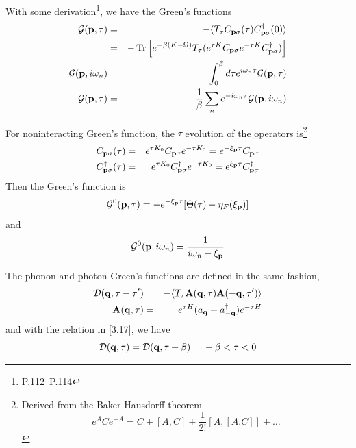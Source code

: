 With some derivation\footnote{P.112~P.114}, we have the Green's functions
\begin{eqnarray}
  \mathcal{G}(\mathbf{p},\tau)&=&-\langle T_\tau C_{\mathbf{p}\sigma}(\tau) C^\dagger_{\mathbf{p}\sigma}(0) \rangle \label{3.33}\\
    &=& -\Tr \left[ e^{-\beta (K-\Omega)} T_\tau (e^{\tau K} C_{\mathbf{p}\sigma} e^{-\tau K} C^\dagger_{\mathbf{p}\sigma})\right] \label{3.34} \\
  \mathcal{G}(\mathbf{p},i\omega_n) &=& \int_0^\beta d\tau e^{i\omega_n \tau} \mathcal{G}(\mathbf{p},\tau)  \label{3.39} \\
  \mathcal{G}(\mathbf{p},\tau) &=& \frac{1}{\beta} \sum_n e^{-i\omega_n \tau} \mathcal{G}(\mathbf{p},i\omega_n) \label{3.40}
\end{eqnarray}

For noninteracting Green's function, the $\tau$ evolution of the operators is\footnote{Derived from the Baker-Hausdorff theorem
\begin{equation*}
  e^ACe^{-A} = C+ [A,C] + \frac{1}{2!}[A,[A.C]]+\dots
\end{equation*}}
\begin{eqnarray}
  C_{\mathbf{p}\sigma}(\tau) &=& e^{\tau K_0} C_{\mathbf{p}\sigma} e^{-\tau K_0} = e^{-\xi_{\mathbf{p}} \tau} C_{\mathbf{p} \sigma } \label{3.44} \\
  C^\dagger_{\mathbf{p}\sigma}(\tau) &=& e^{\tau K_0} C^\dagger_{\mathbf{p}\sigma} e^{-\tau K_0} = e^{\xi_{\mathbf{p}} \tau} C_{\mathbf{p} \sigma }^\dagger \label{3.45}
\end{eqnarray}
Then the Green's function is
\begin{equation}
  \mathcal{G}^0(\mathbf{p},\tau)= -e^{-\xi_{\mathbf{p}} \tau}[\Theta(\tau)-\eta_F(\xi_{\mathbf{p}})] \label{3.49}
\end{equation}
and
\begin{equation}
  \mathcal{G}^0(\mathbf{p},i\omega_n) = \frac{1}{i\omega_n -\xi_{\mathbf{p}}}   \label{3.55}
\end{equation}

The phonon and photon Green's functions are defined in the same fashion,
\begin{eqnarray}
    \mathcal{D} (\mathbf{q},\tau-\tau') &=& - \langle T_\tau \mathbf{A}(\mathbf{q},\tau) \mathbf{A}(-\mathbf{q},\tau') \rangle \label{3.56} \\
    \mathbf{A}(\mathbf{q},\tau) &=& e^{\tau H}(a_{\mathbf{q}}+ a^\dagger_{-\mathbf{q}})e^{-\tau H} \label{3.57}
\end{eqnarray}
and with the relation in \eqref{3.17}, we have
\begin{equation}
  \mathcal{D} (\mathbf{q},\tau) = \mathcal{D} (\mathbf{q}, \tau+\beta)~ ~ ~ ~ -\beta<\tau<0 \label{3.63}
\end{equation}

